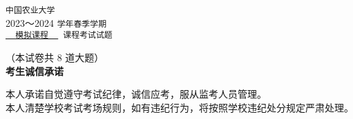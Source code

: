\documentclass[zihao=-4,twoside]{ctexart} %
\newcommand{\subject}{模拟课程}
\begin{document}
\begin{center}
  {\tt 中国农业大学}\\ \vspace{2mm} 
  { 2023～2024 { \tt 学年春季学期}}\\ \vspace{2mm} 
  { \tt \underline{~~\subject~~} 课程考试试题}
\end{center}



\begin{center}
    （本试卷共 8 道大题）\\ 
    \vspace{0.5em} %
    \textbf{考生诚信承诺}
\end{center}
\vspace{-1em} 
{
本人承诺自觉遵守考试纪律，诚信应考，服从监考人员管理。\\ 
本人清楚学校考试考场规则，如有违纪行为，将按照学校违纪处分规定严肃处理。\\ }

\end{document}
